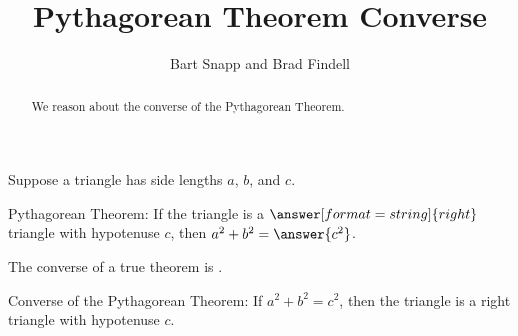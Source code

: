 \documentclass[nooutcomes,noauthor]{ximera}
\title{Pythagorean Theorem Converse}
\author{Bart Snapp and Brad Findell}
\begin{document}
\begin{abstract}
  We reason about the converse of the Pythagorean Theorem.
\end{abstract}
\maketitle


\begin{problem}

Suppose a triangle has side lengths $a$, $b$, and $c$.  

Pythagorean Theorem: If the triangle is a $\answer[format=string]{right}$ triangle with hypotenuse $c$, then $a^2+b^2=\answer{c^2}$.  

The converse of a true theorem is .  

Converse of the Pythagorean Theorem:  If $a^2+b^2=c^2$, then the triangle is a right triangle with hypotenuse $c$.  

\end{problem}
\end{document}
